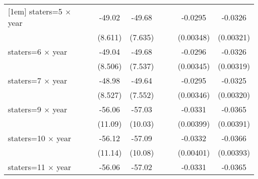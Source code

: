 {\begin{longtable}{l*{8}{c}}
[1em]
staters=5 $\times$ year&                     &                     &      -49.02\sym{***}&      -49.68\sym{***}&                     &                     &     -0.0295\sym{***}&     -0.0326\sym{***}\\
                    &                     &                     &     (8.611)         &     (7.635)         &                     &                     &   (0.00348)         &   (0.00321)         \\
[1em]
staters=6 $\times$ year&                     &                     &      -49.04\sym{***}&      -49.68\sym{***}&                     &                     &     -0.0296\sym{***}&     -0.0326\sym{***}\\
                    &                     &                     &     (8.506)         &     (7.537)         &                     &                     &   (0.00345)         &   (0.00319)         \\
[1em]
staters=7 $\times$ year&                     &                     &      -48.98\sym{***}&      -49.64\sym{***}&                     &                     &     -0.0295\sym{***}&     -0.0325\sym{***}\\
                    &                     &                     &     (8.527)         &     (7.552)         &                     &                     &   (0.00346)         &   (0.00320)         \\
[1em]
staters=9 $\times$ year&                     &                     &      -56.06\sym{***}&      -57.03\sym{***}&                     &                     &     -0.0331\sym{***}&     -0.0365\sym{***}\\
                    &                     &                     &     (11.09)         &     (10.03)         &                     &                     &   (0.00399)         &   (0.00391)         \\
[1em]
staters=10 $\times$ year&                     &                     &      -56.12\sym{***}&      -57.09\sym{***}&                     &                     &     -0.0332\sym{***}&     -0.0366\sym{***}\\
                    &                     &                     &     (11.14)         &     (10.08)         &                     &                     &   (0.00401)         &   (0.00393)         \\
[1em]
staters=11 $\times$ year&                     &                     &      -56.06\sym{***}&      -57.02\sym{***}&                     &                     &     -0.0331\sym{***}&     -0.0365\sym{***}\\

\end{longtable}}
